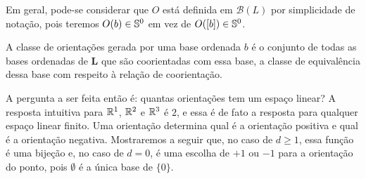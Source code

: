 Em geral, pode-se considerar que $O$ está definida em $\mathcal{B}(L)$ por simplicidade de notação, pois teremos $O(b) \in \S^0$ em vez de $O([b]) \in \S^0$.

A classe de orientações gerada por uma base ordenada $b$ é o conjunto de todas as bases ordenadas de $\bm L$ que são coorientadas com essa base, a classe de equivalência dessa base com respeito à relação de coorientação.

A pergunta a ser feita então é: quantas orientações tem um espaço linear? A resposta intuitiva para $\R^1$, $\R^2$ e $\R^3$ é $2$, e essa é de fato a resposta para qualquer espaço linear finito. Uma orientação determina qual é a orientação positiva e qual é a orientação negativa. Mostraremos a seguir que, no caso de $d \geq 1$, essa função é uma bijeção e, no caso de $d=0$, é uma escolha de $+1$ ou $-1$ para a orientação do ponto, pois $\emptyset$ é a única base de $\{0\}$.

